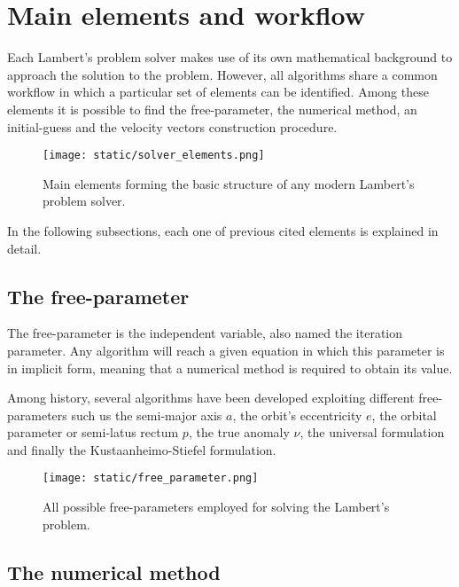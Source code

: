 \section{Main elements and workflow}

Each Lambert's problem solver makes use of its own mathematical background to
approach the solution to the problem. However, all algorithms share a common
workflow in which a particular set of elements can be identified. Among these
elements it is possible to find the free-parameter, the numerical method, an
initial-guess and the velocity vectors construction procedure.

\vspace{0.5cm}
\begin{figure}[h]
  \centering
  \texttt{[image: static/solver\_elements.png]}
  \caption{Main elements forming the basic structure of any modern Lambert's
  problem solver.}
   \label{fig:solver_elements}
\end{figure}


In the following subsections, each one of previous cited elements is explained
in detail.

\subsection{The free-parameter}

The free-parameter is the independent variable, also named the iteration
parameter. Any algorithm will reach a given equation in which this parameter is
in implicit form, meaning that a numerical method is required to obtain its
value.

Among history, several algorithms have been developed exploiting different
free-parameters such us the semi-major axis $a$, the orbit's eccentricity $e$,
the orbital parameter or semi-latus rectum $p$, the true anomaly $\nu$, the
universal formulation and finally the Kustaanheimo-Stiefel formulation.

\vspace{0.5cm}
\begin{figure}[h]
  \centering
  \texttt{[image: static/free\_parameter.png]}
  \caption{All possible free-parameters employed for solving the Lambert's problem.}
  \label{fig:free_parameter}
\end{figure}


\subsection{The numerical method}

